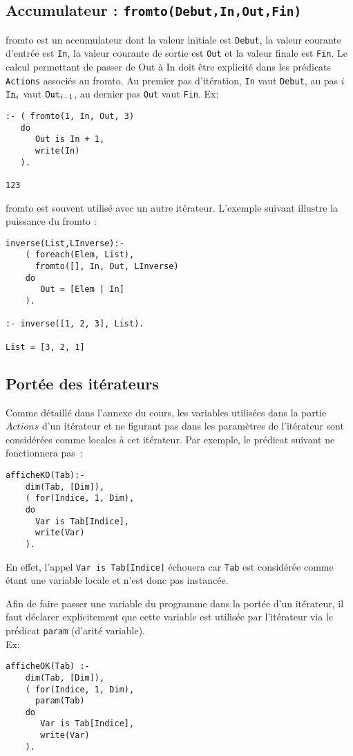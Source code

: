\subsection{Accumulateur : {\tt fromto(Debut,In,Out,Fin)}}
  fromto est un accumulateur dont la
  valeur initiale est \verb|Debut|, la valeur courante d'entrée est
  \verb|In|, la valeur courante de sortie est \verb|Out| et la valeur
  finale est \verb|Fin|. Le calcul permettant de passer de Out à In
  doit être explicité dans les prédicats \verb|Actions| associés au
  fromto. Au premier pas d'itération, \verb|In| vaut \verb|Debut|, au
  pas $i$ $\verb|In|_i$ vaut $\verb|Out|_{i - 1}$, au dernier
  pas \verb|Out| vaut \verb|Fin|. Ex: 
\begin{verbatim}
:- ( fromto(1, In, Out, 3) 
   do 
      Out is In + 1, 
      write(In)
   ).

123  
\end{verbatim}

fromto est souvent utilisé avec un autre itérateur. L'exemple suivant illustre la puissance du fromto :
\begin{verbatim}
inverse(List,LInverse):- 
    ( foreach(Elem, List), 
      fromto([], In, Out, LInverse) 
    do 
       Out = [Elem | In]
    ).

:- inverse([1, 2, 3], List).

List = [3, 2, 1]
\end{verbatim}

\subsection*{Portée des itérateurs}
Comme détaillé dans l'annexe du cours, les variables utilisées dans la
partie $Actions$ d'un itérateur et ne figurant pas dans les paramètres
de l'itérateur sont considérées comme locales à cet itérateur.  Par
exemple, le prédicat suivant ne fonctionnera pas~:
\begin{verbatim}
afficheKO(Tab):-
    dim(Tab, [Dim]),
    ( for(Indice, 1, Dim),
    do 
      Var is Tab[Indice],
      write(Var)
    ).
\end{verbatim}
En effet, l'appel \verb|Var is Tab[Indice]| échouera car \verb|Tab| est considérée comme étant une variable locale et n'est donc pas instancée. 

Afin de faire passer une variable du programme dans la portée d'un itérateur, il faut déclarer explicitement que cette variable est utilisée par l'itérateur via le prédicat
 \verb|param| (d'arité variable).\\
Ex: 
\begin{verbatim}
afficheOK(Tab) :-
    dim(Tab, [Dim]),    
    ( for(Indice, 1, Dim), 
      param(Tab) 
    do 
       Var is Tab[Indice], 
       write(Var)
    ). 
\end{verbatim}


